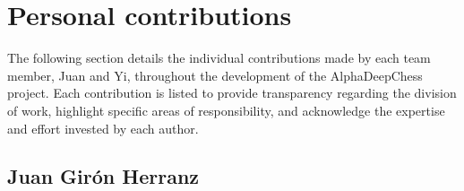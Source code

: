 \chapter{Personal contributions}\label{cap:contribucionesPersonales}

The following section details the individual contributions made by each team member, Juan and Yi, throughout the development of the AlphaDeepChess project. Each contribution is listed to provide transparency regarding the division of work, highlight specific areas of responsibility, and acknowledge the expertise and effort invested by each author.

\section*{Juan Girón Herranz}

